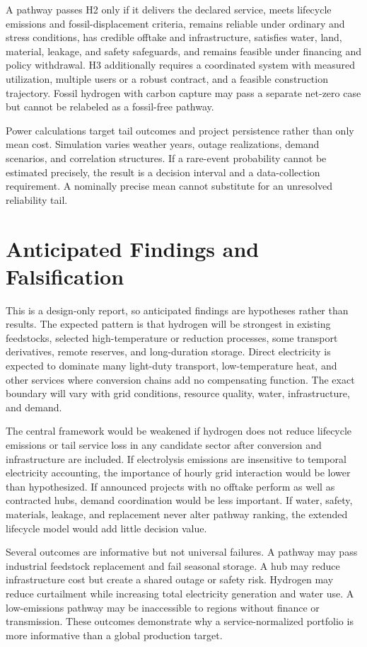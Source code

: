 \documentclass[conference]{IEEEtran}
\begin{document}
A pathway passes H2 only if it delivers the declared service, meets lifecycle emissions and fossil-displacement criteria, remains reliable under ordinary and stress conditions, has credible offtake and infrastructure, satisfies water, land, material, leakage, and safety safeguards, and remains feasible under financing and policy withdrawal. H3 additionally requires a coordinated system with measured utilization, multiple users or a robust contract, and a feasible construction trajectory. Fossil hydrogen with carbon capture may pass a separate net-zero case but cannot be relabeled as a fossil-free pathway.

Power calculations target tail outcomes and project persistence rather than only mean cost. Simulation varies weather years, outage realizations, demand scenarios, and correlation structures. If a rare-event probability cannot be estimated precisely, the result is a decision interval and a data-collection requirement. A nominally precise mean cannot substitute for an unresolved reliability tail.

\section{Anticipated Findings and Falsification}
\label{sec:anticipated}
This is a design-only report, so anticipated findings are hypotheses rather than results. The expected pattern is that hydrogen will be strongest in existing feedstocks, selected high-temperature or reduction processes, some transport derivatives, remote reserves, and long-duration storage. Direct electricity is expected to dominate many light-duty transport, low-temperature heat, and other services where conversion chains add no compensating function. The exact boundary will vary with grid conditions, resource quality, water, infrastructure, and demand.

The central framework would be weakened if hydrogen does not reduce lifecycle emissions or tail service loss in any candidate sector after conversion and infrastructure are included. If electrolysis emissions are insensitive to temporal electricity accounting, the importance of hourly grid interaction would be lower than hypothesized. If announced projects with no offtake perform as well as contracted hubs, demand coordination would be less important. If water, safety, materials, leakage, and replacement never alter pathway ranking, the extended lifecycle model would add little decision value.

Several outcomes are informative but not universal failures. A pathway may pass industrial feedstock replacement and fail seasonal storage. A hub may reduce infrastructure cost but create a shared outage or safety risk. Hydrogen may reduce curtailment while increasing total electricity generation and water use. A low-emissions pathway may be inaccessible to regions without finance or transmission. These outcomes demonstrate why a service-normalized portfolio is more informative than a global production target.
\end{document}
